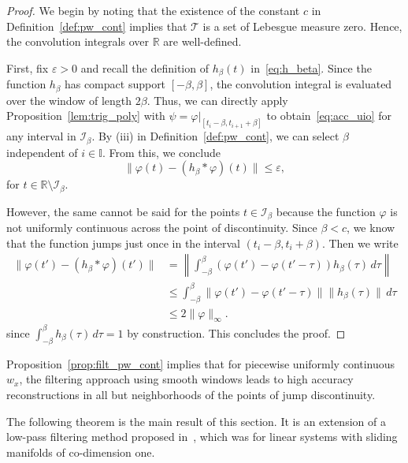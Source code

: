 \documentclass[times, doublespace]{rncauth}
\begin{document}
\begin{proof}
	We begin by noting that the existence of the constant $c$ in Definition~\ref{def:pw_cont} implies that $\mathcal T$ is a set of Lebesgue measure zero. Hence, the convolution integrals over $\mathbb{R}$ are well-defined.
	
	First, fix $\varepsilon>0$ and recall the definition of $h_\beta(t)$ in~\eqref{eq:h_beta}. Since the function $h_\beta$ has compact support $[-\beta, \beta]$, the convolution integral is evaluated over the window of length $2\beta$. Thus, we can directly apply Proposition~\ref{lem:trig_poly} with $\psi = \varphi|_{[t_i-\beta, t_{i+1}+\beta]}$ to obtain~\eqref{eq:acc_uio} for any interval in $\mathcal I_\beta$. By (iii) in Definition~\ref{def:pw_cont}, we can select $\beta$ independent of $i\in\mathbb{I}$. From this, we conclude
	\[
	\|\varphi(t) - (h_\beta\ast \varphi)(t)\| \le \varepsilon,
	\]
	for $t\in \mathbb{R}\setminus\mathcal{I}_\beta$.
	
	However, the same cannot be said for the points $t\in\mathcal{I}_\beta$ because the function $\varphi$ is not uniformly continuous across the point of discontinuity. Since $\beta<c$, we know that the function jumps just once in the interval $(t_i-\beta, t_i+\beta)$. Then we write
	\begin{align*}
	\|\varphi(t') - (h_\beta\ast \varphi)(t')\|&=\left\|\int_{-\beta}^{\beta} \left(\varphi(t')- \varphi(t'-\tau)\right)h_\beta(\tau)\,d\tau\right\|\\
	&\le \int_{-\beta}^{\beta} \left\|\varphi(t')- \varphi(t'-\tau)\right\|\|h_\beta(\tau)\|\,d\tau\\
	&\le 2\|\varphi\|_\infty.
	\end{align*}
	since $\int_{-\beta}^{\beta} h_\beta(\tau)\,d\tau = 1$ by construction. This concludes the proof.
\end{proof}
Proposition~\ref{prop:filt_pw_cont} implies that for piecewise uniformly continuous $w_x$, the filtering approach using smooth windows leads to high accuracy reconstructions in all but neighborhoods of the points of jump discontinuity.

The following theorem is the main result of this section. It is an extension of a low-pass filtering method proposed in~\cite{Hui2013}, which was for linear systems with sliding manifolds of co-dimension one. 
\end{document}
